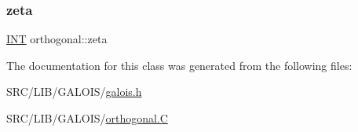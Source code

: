 \subsubsection{\texorpdfstring{zeta}{zeta}}
{\footnotesize\ttfamily \mbox{\hyperlink{galois_8h_a09fddde158a3a20bd2dcadb609de11dc}{I\+NT}} orthogonal\+::zeta}



The documentation for this class was generated from the following files\+:\begin{DoxyCompactItemize}
\item 
S\+R\+C/\+L\+I\+B/\+G\+A\+L\+O\+I\+S/\mbox{\hyperlink{galois_8h}{galois.\+h}}\item 
S\+R\+C/\+L\+I\+B/\+G\+A\+L\+O\+I\+S/\mbox{\hyperlink{_l_i_b_2_g_a_l_o_i_s_2orthogonal_8_c}{orthogonal.\+C}}\end{DoxyCompactItemize}
